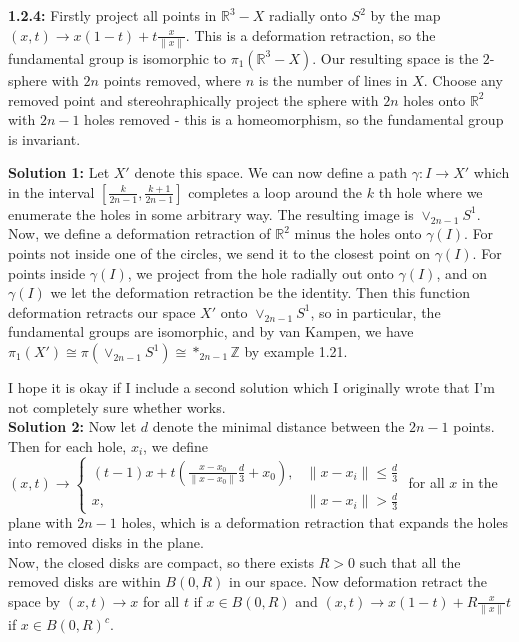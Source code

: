 \documentclass[a4paper]{article}
\begin{document}
    \textbf{1.2.4:} 
    Firstly project all points in $\mathbb{R}^3 - X$ 
    radially onto $S^{2}$ by the map
    $(x,t) \to x(1-t) + t \frac{x}{\|x \|}$. This is a deformation retraction, so
    the fundamental group is isomorphic to
    $\pi_1 \left( \mathbb{R}^3 -X \right) $.
    Our resulting space is the $2$-sphere with $2n$ 
    points removed, where $n$ is the number of lines
    in $X$. Choose any removed point and stereohraphically project the sphere
    with $2n$ holes onto $\mathbb{R}^2$ with
    $2n-1$ holes removed - this is a homeomorphism, so the fundamental group is
    invariant.\\
    \linebreak
    

    \textbf{Solution 1:} Let $X'$ denote this space. 
    We can now define a path $\gamma  \colon I
    \to X'$ which in the interval $\left[ \frac{k}{2n-1},
    \frac{k+1}{2n-1} \right] $ completes a loop around the $k$ th hole
    where we enumerate the holes in some arbitrary way.
    The resulting image is  $\lor_{2n-1}S^{1}$. Now, we define a 
    deformation retraction of $\mathbb{R}^2$ minus the holes onto
     $\gamma(I)$. For points not inside one of the circles, we
     send it to the closest point on $\gamma(I)$. For
     points inside $\gamma(I)$, we project from the hole radially out
     onto $\gamma(I)$, and on $\gamma(I)$ we let the deformation retraction be
     the identity. Then this function deformation retracts
     our space $X'$ onto $\lor_{2n-1}S^{1}$, so in particular,
     the fundamental groups are isomorphic, and by van Kampen, we
     have $\pi_1 (X') \cong \pi \left( \lor_{2n-1}S^{1} \right) 
     \cong *_{2n-1} \mathbb{Z} $ by example 1.21.\\
     \linebreak
     




     I hope it is okay if I include a second solution which I originally wrote
     that I'm not completely sure whether works.\\
     \textbf{Solution 2:}
    Now let $d$ denote the minimal distance between
    the $2n-1$ points. Then for each hole, $x_i$, we define
    $(x,t) \to \begin{cases}
        (t-1) x + t (\frac{x-x_0}{\| x - x_0 \|} \frac{d}{3} + x_0), & \|x
        - x_i\| \le \frac{d}{3}\\
        x, & \|x - x_i\| > \frac{d}{3}
    \end{cases} $
    for all $x$ in the plane with $2n-1$ holes,
    which is a deformation
    retraction that expands the holes into removed disks in the plane.\\
    \linebreak
    Now, the closed disks are compact, so there exists $R>0$ such that
    all the removed disks are within
    $B(0, R)$ in our space. Now deformation retract the space
    by
    $(x,t) \to x $ for all $t$ if $x \in B(0,R)$ and
    $(x,t) \to x (1-t) + R \frac{x}{\|x\|}t$ if $x \in 
    B\left( 0,R \right)^{c}$.
\end{document}
